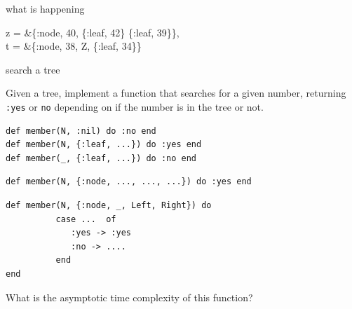 \begin{frame}{what is happening}

\begin{code}
  z = &\{:node, 40, \{:leaf, 42\} \{:leaf, 39\}\},\\
  t = &\{:node, 38, Z, \{:leaf, 34\}\}
\end{code}
\pause \vspace{20pt}


\end{frame}


\begin{frame}[fragile]{search a tree}

Given a tree, implement a function that searches for a given number,
returning {\tt :yes} or {\tt no} depending on if the number is in the
tree or not.

\pause\vspace{20pt}

\begin{verbatim}
def member(N, :nil) do :no end
def member(N, {:leaf, ...}) do :yes end
def member(_, {:leaf, ...}) do :no end
\end{verbatim}
\pause
\begin{verbatim}
def member(N, {:node, ..., ..., ...}) do :yes end
\end{verbatim}
\pause

\begin{verbatim}
def member(N, {:node, _, Left, Right}) do 
          case ...  of
             :yes -> :yes
             :no -> ....
          end
end
\end{verbatim}

\pause\vspace{20pt}
What is the asymptotic time complexity of this function?
\end{frame}


